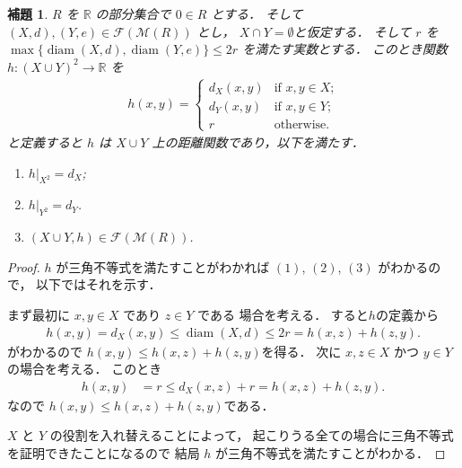 \documentclass[leqno, 12pt]{jsarticle}
\newtheorem{lem}[thm]{補題}
\newcommand{\rr}{\mathbb{R}}
\DeclareMathOperator{\di}{diam}
\begin{document}
\begin{lem}\label{lem:amal:pushout2}
$R$
を
$\rr$
の部分集合で
$0\in R$
とする．
そして
$(X, d), (Y, e)\in \mathscr{F}(\mathscr{M}(R))$
とし，
$X\cap Y=\emptyset$と仮定する．
そして
$r$
を
$\max\{\di(X, d), \di(Y, e)\}\le 2r$
を満たす実数とする．
このとき関数
$h\colon (X\cup Y)^2\to \rr$
を
\begin{align*}
	h(x, y)=
		\begin{cases}
		d_{X}(x, y) & \text{if $x, y\in X$;}\\
		d_{Y}(x, y) & \text{if $x, y\in Y$;}\\
		r & \text{otherwise.}
				\end{cases}
\end{align*} 
と定義すると
$h$
は
$X\cup Y$
上の距離関数であり，以下を満たす．
\begin{enumerate}
\item $h|_{X^2}=d_{X}$; 
	\item $h|_{Y^2}=d_{Y}$. 
	\item $(X\cup Y, h)\in \mathscr{F}(\mathscr{M}(R))$. 
\end{enumerate}
\end{lem}
\begin{proof}
$h$
が三角不等式を満たすことがわかれば
$(1)$, 
$(2)$, 
$(3)$
がわかるので，
以下ではそれを示す．



まず最初に
$x, y\in X$ 
であり
$z\in Y$
である
場合を考える．
すると$h$の定義から
\begin{align*}
	h(x, y)=d_{X}(x, y)\le \di(X, d)\le 2r=h(x, z)+h(z, y). 
\end{align*}
がわかるので
$h(x, y)\le h(x, z)+h(z, y)$を得る．
次に
$x, z\in  X$ 
かつ 
$y\in Y$
の場合を考える．
このとき
\begin{align*}
	h(x, y)&=r \le d_{X}(x, z)+r =h(x, z)+h(z, y). 
\end{align*}
なので
$h(x, y)\le h(x, z)+h(z, y)$である．

$X$
と
$Y$
の役割を入れ替えることによって，
起こりうる全ての場合に三角不等式を証明できたことになるので
結局
$h$
が三角不等式を満たすことがわかる．
\end{proof}
\end{document}
